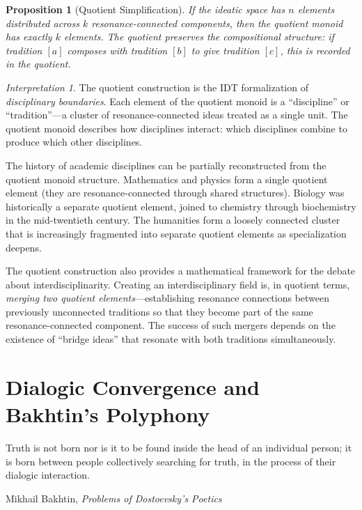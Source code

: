 \documentclass[11pt,openany]{book}
\theoremstyle{definition}
\theoremstyle{plain}
\newtheorem{proposition}[axiom]{Proposition}
\theoremstyle{remark}
\newtheorem{interpretation}[axiom]{Interpretation}
\begin{document}
\begin{proposition}[Quotient Simplification]
If the ideatic space has $n$ elements distributed across $k$ resonance-connected components, then the quotient monoid has exactly $k$ elements. The quotient preserves the compositional structure: if tradition $[a]$ composes with tradition $[b]$ to give tradition $[c]$, this is recorded in the quotient.
\end{proposition}

\begin{interpretation}
The quotient construction is the IDT formalization of \emph{disciplinary boundaries}. Each element of the quotient monoid is a ``discipline'' or ``tradition''---a cluster of resonance-connected ideas treated as a single unit. The quotient monoid describes how disciplines interact: which disciplines combine to produce which other disciplines.

The history of academic disciplines can be partially reconstructed from the quotient monoid structure. Mathematics and physics form a single quotient element (they are resonance-connected through shared structures). Biology was historically a separate quotient element, joined to chemistry through biochemistry in the mid-twentieth century. The humanities form a loosely connected cluster that is increasingly fragmented into separate quotient elements as specialization deepens.

The quotient construction also provides a mathematical framework for the debate about interdisciplinarity. Creating an interdisciplinary field is, in quotient terms, \emph{merging two quotient elements}---establishing resonance connections between previously unconnected traditions so that they become part of the same resonance-connected component. The success of such mergers depends on the existence of ``bridge ideas'' that resonate with both traditions simultaneously.
\end{interpretation}

\chapter{Dialogic Convergence and Bakhtin's Polyphony}
\label{ch:dialogic}

\epigraph{Truth is not born nor is it to be found inside the head of an individual person; it is born between people collectively searching for truth, in the process of their dialogic interaction.}{Mikhail Bakhtin, \textit{Problems of Dostoevsky's Poetics}}
\end{document}

